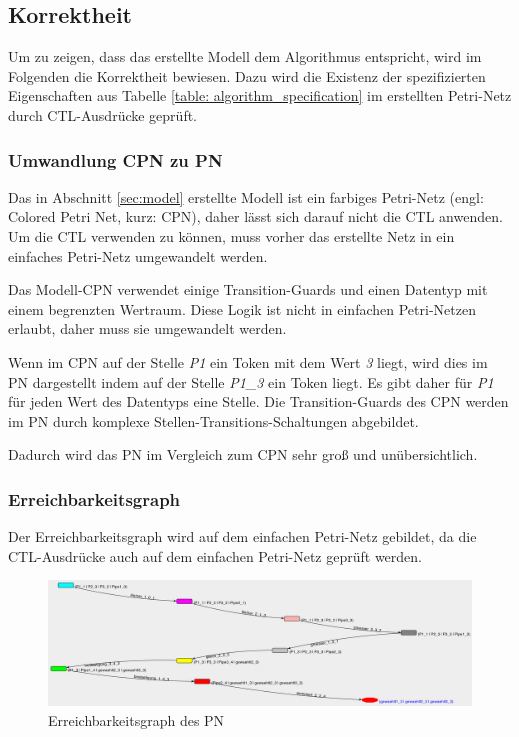 \subsection{Korrektheit}
Um zu zeigen, dass das erstellte Modell dem Algorithmus entspricht, wird im Folgenden die Korrektheit bewiesen. Dazu wird die Existenz der spezifizierten Eigenschaften aus Tabelle \ref{table: algorithm_specification} im erstellten Petri-Netz durch CTL-Ausdrücke geprüft.

\subsubsection{Umwandlung CPN zu PN}
Das in Abschnitt \ref{sec:model} erstellte Modell ist ein farbiges Petri-Netz (engl: Colored Petri Net, kurz: CPN), daher lässt sich darauf nicht die CTL anwenden. Um die CTL verwenden zu können, muss vorher das erstellte Netz in ein einfaches Petri-Netz umgewandelt werden.

Das Modell-CPN verwendet einige Transition-Guards und einen Datentyp mit einem begrenzten Wertraum. Diese Logik ist nicht in einfachen Petri-Netzen erlaubt, daher muss sie umgewandelt werden.

Wenn im CPN auf der Stelle \textit{P1} ein Token mit dem Wert \textit{3} liegt, wird dies im PN dargestellt indem auf der Stelle \textit{P1\_3} ein Token liegt. Es gibt daher für \textit{P1} für jeden Wert des Datentyps eine Stelle. Die Transition-Guards des CPN werden im PN durch komplexe Stellen-Transitions-Schaltungen abgebildet.

Dadurch wird das PN im Vergleich zum CPN sehr groß und unübersichtlich.

\subsubsection{Erreichbarkeitsgraph}
Der Erreichbarkeitsgraph wird auf dem einfachen Petri-Netz gebildet, da die CTL-Ausdrücke auch auf dem einfachen Petri-Netz geprüft werden.

\begin{figure}[H]
\centering
\includegraphics[width=1\linewidth]{img/reachibility_graph}
\caption{Erreichbarkeitsgraph des PN}
\label{fig:reachibility_graph}
\end{figure}


